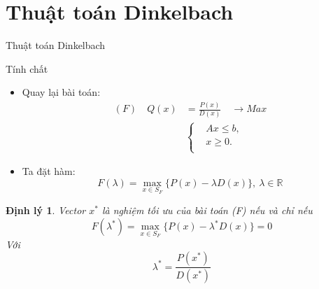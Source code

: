 \documentclass{beamer}
\newtheorem{dl}{Định lý}[section]
\begin{document}
\section{Thuật toán Dinkelbach}
\begin{frame}
   \center 
   \Huge Thuật toán Dinkelbach
\end{frame}

\begin{frame}{Tính chất} \large
\begin{itemize}
\item Quay lại bài toán:
\begin{equation} \label{F}
    \begin{split}
    (F) \quad Q(x) & = \frac{P(x)}{D(x)} \quad \longrightarrow Max \\
        & \left\{
        \begin{split}
        &Ax \leq  b, \\
        &x \geq 0. \\
        \end{split}
        \right.    
    \end{split}
\end{equation}            
\item Ta đặt hàm:
\begin{equation}
F(\lambda) = \underset{x \in S_F}{\max}\{P(x)-\lambda D(x)\}, \: \lambda \in \mathbb{R}
\end{equation}
\end{itemize}
\end{frame}

\begin{frame}
\begin{dl}
Vector $x^*$ là nghiệm tối ưu của bài toán (F) nếu và chỉ nếu 
\begin{equation}
F(\lambda^*) = \underset{x \in S_F}{\max}\{P(x)-\lambda^* D(x)\} = 0 
\end{equation}
Với
\begin{equation}
\lambda^* = \frac{P(x^*)}{D(x^*)}
\end{equation}
\end{dl}
\end{frame}
\end{document}
